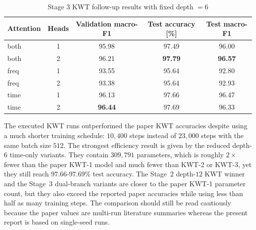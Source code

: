 \documentclass[11pt]{article}
\begin{document}
\begin{table}[t!]
\centering
\caption{Stage 3 KWT follow-up results with fixed depth \(=6\)}
\label{tab:stage3-results}
\smallskip
\small
\begin{tabular}{@{}lcccc@{}}
\toprule
\textbf{Attention} & \textbf{Heads} & \textbf{Validation macro-F1} & \textbf{Test accuracy [\%]} & \textbf{Test macro-F1}\\
\midrule
both & 1 & 95.98 & 97.49 & 96.00 \\
both & 2 & 96.21 & \textbf{97.79} & \textbf{96.57} \\
freq & 1 & 93.55 & 95.64 & 92.80 \\
freq & 2 & 93.38 & 95.64 & 92.93 \\
time & 1 & 96.13 & 97.66 & 96.47 \\
time & 2 & \textbf{96.44} & 97.69 & 96.33 \\
\bottomrule
\end{tabular}
\end{table}


The executed KWT runs outperformed the paper KWT accuracies despite using a much shorter training schedule: \(10{,}400\) steps instead of \(23{,}000\) steps with the same batch size \(512\). The strongest efficiency result is given by the reduced depth-\(6\) time-only variants. They contain \(309{,}791\) parameters, which is roughly \(2\times\) fewer than the paper KWT-1 model and much fewer than KWT-2 or KWT-3, yet they still reach \(97.66\)-\(97.69\%\) test accuracy. The Stage~2 depth-\(12\) KWT winner and the Stage~3 dual-branch variants are closer to the paper KWT-1 parameter count, but they also exceed the reported paper accuracies while using less than half as many training steps. The comparison should still be read cautiously because the paper values are multi-run literature summaries whereas the present report is based on single-seed runs.
\end{document}
